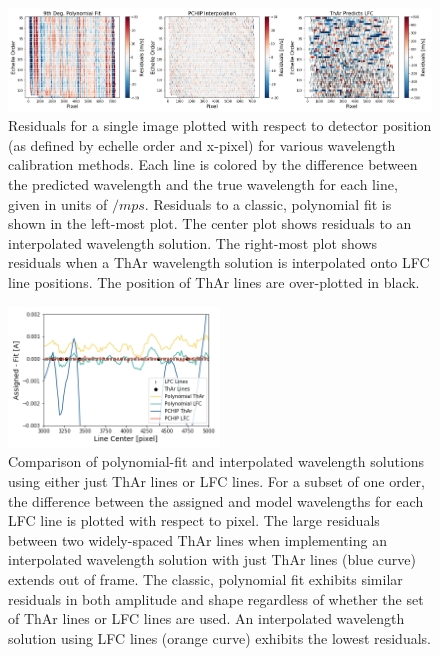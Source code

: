 \documentclass[modern]{aastex63}
\begin{document}
\begin{figure}[t]
\centering
\includegraphics[width=\textwidth]{Figures/lineResids2D.png}
\caption{Residuals for a single image plotted with respect to detector position (as defined by echelle order and x-pixel) for various wavelength calibration methods.  Each line is colored by the difference between the predicted wavelength and the true wavelength for each line, given in units of $/mps$.  Residuals to a classic, polynomial fit is shown in the left-most plot.  The center plot shows residuals to an interpolated wavelength solution.  The right-most plot shows residuals when a ThAr wavelength solution is interpolated onto LFC line positions.  The position of ThAr lines are over-plotted in black.}
\label{fig:resid2d}
\end{figure}

\begin{figure}[t]
\centering
\includegraphics[width=0.5\textwidth]{Figures/lineDensity.png}
\caption{Comparison of polynomial-fit and interpolated wavelength solutions using either just ThAr lines or LFC lines.  For a subset of one order, the difference between the assigned and model wavelengths for each LFC line is plotted with respect to pixel.  The large residuals between two widely-spaced ThAr lines when implementing an interpolated wavelength solution with just ThAr lines (blue curve) extends out of frame.  The classic, polynomial fit exhibits similar residuals in both amplitude and shape regardless of whether the set of ThAr lines or LFC lines are used.  An interpolated wavelength solution using LFC lines (orange curve) exhibits the lowest residuals.}
\label{fig:waveResids}
\end{figure} 
\end{document}
